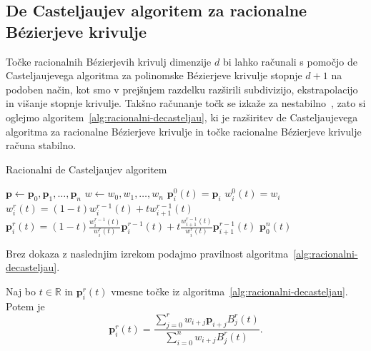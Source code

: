\documentclass[isrm2, tisk]{fmfdelo}
\newcommand{\R}{\mathbb R}
\newcommand{\p}{\mathbf{p}}
\begin{document}

    \subsection{De Casteljaujev algoritem za racionalne Bézierjeve krivulje}
    Točke racionalnih Bézierjevih krivulj dimenzije $d$ bi lahko računali s pomočjo de Casteljaujevega algoritma za polinomske Bézierjeve krivulje stopnje $d+1$ na podoben način, kot smo v prejšnjem razdelku razširili subdivizijo, ekstrapolacijo in višanje stopnje krivulje.
    Takšno računanje točk se izkaže za nestabilno~\cite{stability-rational}, zato si oglejmo algoritem~\ref{alg:racionalni-decasteljau}, ki je razširitev de Casteljaujevega algoritma za racionalne Bézierjeve krivulje in točke racionalne Bézierjeve krivulje računa stabilno.
    \begin{algorithm}[h!]
        \caption{Racionalni de Casteljaujev algoritem}
        \begin{algorithmic}
            \State $\p \gets \p_0,\p_1,\dots,\p_n$
            \State $w\gets w_0,w_1,\dots,w_n$
                \State $\p_i^0(t)=\p_i$
                \State $w_i^0(t)=w_i$
            \EndFor
                    \State $w_i^r(t)=(1-t)w_{i}^{r-1}(t)+tw_{i+1}^{r-1}(t)$
                    \State $\p_i^r(t)=(1-t)\frac{w_{i}^{r-1}(t)}{w_{i}^{r}(t)}\p_i^{r-1}(t)+t\frac{w_{i+1}^{r-1}(t)}{w_{i}^{r}(t)}\p_{i+1}^{r-1}(t)$
                \EndFor
            \EndFor
            \State \Return $\p_0^n(t)$
        \end{algorithmic}\label{alg:racionalni-decasteljau}
    \end{algorithm}
    \noindent Brez dokaza z naslednjim izrekom podajmo pravilnost algoritma~\ref{alg:racionalni-decasteljau}.
    \begin{izrek}
        Naj bo $t\in\R$ in $\p_i^r(t)$ vmesne točke iz algoritma~\ref{alg:racionalni-decasteljau}.
        Potem je
        \[\p_i^r(t)= \frac{\sum^{r}_{j=0}w_{i+j}\p_{i+j} B^r_j(t)}{\sum^{n}_{i=0}w_{i+j} B^r_j(t)}. \]
    \end{izrek}
\end{document}
